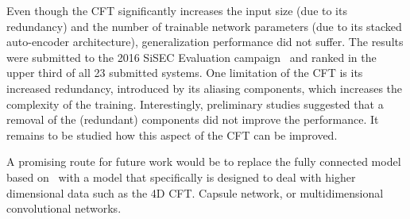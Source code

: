 \par
Even though the CFT significantly increases the input size (due to its redundancy) and the number of trainable network parameters (due to its stacked auto-encoder architecture), generalization performance did not suffer.
The results were submitted to the 2016 SiSEC Evaluation campaign~\cite{sisec16} and ranked in the upper third of all 23 submitted systems.
One limitation of the CFT is its increased redundancy, introduced by its aliasing components,  which increases the complexity of the training.
Interestingly, preliminary studies suggested that a removal of the (redundant) components did not improve the performance.
It remains to be studied how this aspect of the CFT can be improved.
\par
A promising route for future work would be to replace the fully connected model based on~\cite{uhlich15} with a model that specifically is designed to deal with higher dimensional data such as the 4D CFT. Capsule network, or multidimensional convolutional networks.
